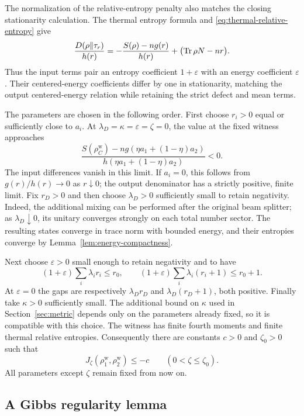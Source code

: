 The normalization of the relative-entropy penalty also matches the closing
stationarity calculation. The thermal entropy formula and
\eqref{eq:thermal-relative-entropy} give
\[
 \frac{D(\rho\Vert\tau_r)}{h(r)}
 =-\frac{S(\rho)-ng(r)}{h(r)}+\bigl(\operatorname{Tr}\rho N-nr\bigr).
\]
Thus the input terms pair an entropy coefficient $1+\varepsilon$ with an
energy coefficient $\varepsilon$. Their centered-energy coefficients
differ by one in stationarity, matching the output centered-energy
relation while retaining the strict defect and mean terms.

The parameters are chosen in the following order. First choose $r_i>0$
equal or sufficiently close to $a_i$. At
$\lambda_D=\kappa=\varepsilon=\zeta=0$, the value at the fixed witness
approaches
\[
 \frac{S(\rho_C^{\mathrm{w}})
       -ng(\eta a_1+(1-\eta)a_2)}
      {h(\eta a_1+(1-\eta)a_2)}<0.
\]
The input differences vanish in this limit. If $a_i=0$, this follows
from $g(r)/h(r)\to0$ as $r\downarrow0$; the output denominator has a
strictly positive, finite limit. Fix $r_D>0$ and then choose
$\lambda_D>0$ sufficiently small to retain negativity. Indeed, the
additional mixing can be performed after the original beam splitter;
as $\lambda_D\downarrow0$, its unitary converges strongly on each total
number sector. The resulting states converge in trace norm with bounded
energy, and their entropies converge by Lemma~\ref{lem:energy-compactness}.

Next choose $\varepsilon>0$ small enough to retain negativity and to have
\begin{equation}\label{eq:slack}
 (1+\varepsilon)\sum_i\lambda_ir_i\le r_0,
 \qquad
 (1+\varepsilon)\sum_i\lambda_i(r_i+1)\le r_0+1.
\end{equation}
At $\varepsilon=0$ the gaps are respectively $\lambda_Dr_D$ and
$\lambda_D(r_D+1)$, both positive. Finally take $\kappa>0$ sufficiently
small. The additional bound on $\kappa$ used in Section~\ref{sec:metric}
depends only on the parameters already fixed, so it is compatible with
this choice. The witness has finite fourth moments and finite thermal
relative entropies. Consequently there are constants $c>0$ and
$\zeta_0>0$ such that
\begin{equation}\label{eq:negative-witness}
 J_\zeta(\rho_1^{\mathrm{w}},\rho_2^{\mathrm{w}})\le -c
 \qquad(0<\zeta\le\zeta_0).
\end{equation}
All parameters except $\zeta$ remain fixed from now on.

\subsection{A Gibbs regularity lemma}

